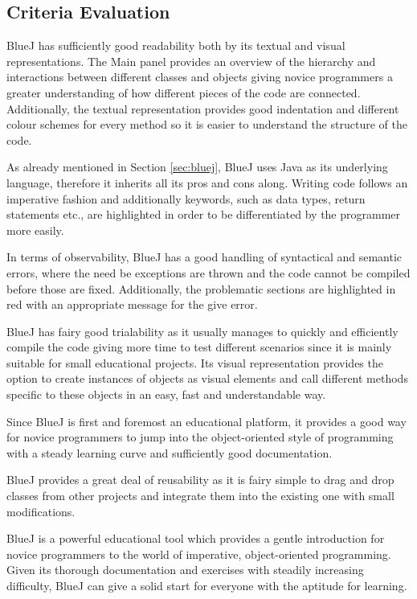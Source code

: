 \subsection{Criteria Evaluation}
\begin{description}[style=nextline]
\item[Readability]
BlueJ has sufficiently good readability both by its textual and visual representations. The Main panel provides an overview of the hierarchy and interactions between different classes and objects giving novice programmers a greater understanding of how different pieces of the code are connected. Additionally, the textual representation provides good indentation and different colour schemes for every method so it is easier to understand the structure of the code.
\item[Writability]
As already mentioned in Section \ref{sec:bluej}, BlueJ uses Java as its underlying language, therefore it inherits all its pros and cons along. Writing code follows an imperative fashion and additionally keywords, such as data types, return statements etc., are highlighted in order to be differentiated by the programmer more easily.  
\item[Observability]
In terms of observability, BlueJ has a good handling of syntactical and semantic errors, where the need be exceptions are thrown and the code cannot be compiled before those are fixed. Additionally, the problematic sections are highlighted in red with an appropriate message for the give error.
\item[Trialability]
BlueJ has fairy good trialability as it usually manages to quickly and efficiently compile the code giving more time to test different scenarios since it is mainly suitable for small educational projects. Its visual representation provides the option to create instances of objects as visual elements and call different methods specific to these objects in an easy, fast and understandable way.
\item[Learnability]
Since BlueJ is first and foremost an educational platform, it provides a good way for novice programmers to jump into the object-oriented style of programming with a steady learning curve and sufficiently good documentation.
\item[Reusability]
BlueJ provides a great deal of reusability as it is fairy simple to drag and drop classes from other projects and integrate them into the existing one with small modifications. 
\item[Pedagogic Value]
BlueJ is a powerful educational tool which provides a gentle introduction for novice programmers to the world of imperative, object-oriented programming. Given its thorough documentation and exercises with steadily increasing difficulty, BlueJ can give a solid start for everyone with the aptitude for learning.

\end{description}
